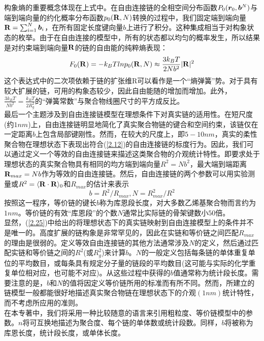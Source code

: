 构象熵的重要概念体现在上式中。在自由连接链的全相空间分布函数$P_0(\bm{r}_0,\bm{b}^{N})$与端到端向量的约化概率分布函数$p_0(\mathbf{R},N)$转换的过程中，我们固定端到端向量$\mathbf{R}=\sum _{i=1}^{N} \bm{b}_{i}$，在所有固定长度键向量$b$上进行了积分。这种集成相当于对构象状态的枚举。由于在自由连接的模型中，所有的状态都以均匀的概率发生，所以结果是对约束端到端向量$\mathbf{R}$的链的自由能的纯粹熵表现：\\
\begin{equation}
F_0(\mathbf{R})=-k_{B}Tlnp_0(\mathbf{R},N)\approx \frac{3k_{B}T}{2Nb^2}|\mathbf{R}|^2
\label{2.24}
\end{equation}
这个表达式中的二次项依赖于链的扩张维R可以看作是一个“熵弹簧”势。对于具有较大扩展的链，可用的构象态较少，因此自由能随的增加而增加。此外，$\frac{3k_{B}T}{Nb^2}=\frac{k_{B}T}{2R^2_{g}}$的“弹簧常数”与聚合物线圈尺寸的平方成反比。\\

最后一个主题涉及到自由连接链模型在理想条件下对真实链的适用性。在短尺度(约$1nm$)上，自由连接链明显地简化了真实聚合物链的键合和空间约束，该链仅在一定距离$b$上包含局部键刚性。然而，在较大的尺度上，即$5-10nm$，真实的柔性聚合物在理想状态下表现出符合(\ref{2.12})的自由连接链的标度行为。因此，我们可以通过定义一个等效的自由连接链来描述这类聚合物的介观统计特性。即要求处于理想状态的真实聚合物具有相同的均方端到端向量$R^2=Nb^2$，最大端到端距离$\mathbf{R}_{max}=Nb$作为等效的自由连接链。然后，自由连接链的两个参数可以用实验测量或$R^2=\langle \mathbf{R} \cdot \mathbf{R}\rangle_{0}$和$R_{max}$的估计来表示\\
\begin{equation}
b=R^2/R_{max},N=R_{max}^{2}/R^2
\label{2.25}
\end{equation}
按照这一程序，等价链的键长$b$称为库恩段长度，对大多数乙烯基聚合物而言约为$1nm$。等价链的有效“库恩段”的个数$N$通常比实际链的骨架键数小$50$倍。\\

显然，(\ref{2.25})中给出的将理想状态下的真实链映射到自由连接模型上的条件并不是唯一的。高度扩展的链构象是非常罕见的，因此在实链和等价链之间匹配$R_{max}$的理由是很弱的。定义等效自由连接链的其他方法通常涉及$N$的定义，然后通过匹配实链和等价链之间的$R^2$(或$R_{g}^{2}$)来计算$b$。$N$的一般定义包括每条链的单体重复单位的平均数目，或每条具有规定分子量的链段的平均数目(这可能与实际的化学重复单位相对应，也可能不对应)。从这些过程中获得的$b$值通常称为统计段长度。需要注意的是，$b$和$N$的值将因定义等价链所用的标准而有所不同。然而，所建立的链模型一般都能很好地描述真实聚合物链在理想状态下的介观$(1nm)$统计特性，而不考虑所应用的准则。\\

在本专著中，我们将采用一种比较随意的语言来引用粗粒度、等价链模型中的参数。$n$将可互换地描述为聚合度、每个链的单体数或统计段数。同样，$b$将被称为库恩长度，统计段长度，或单体长度。\\
\endinput
